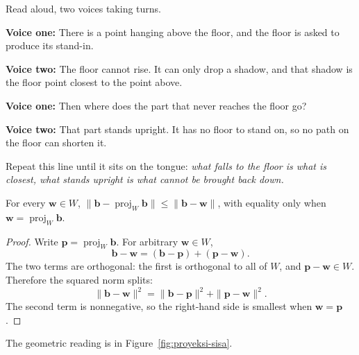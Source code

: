 \begin{bacakeras}
Read aloud, two voices taking turns.

\textbf{Voice one:} There is a point hanging above the floor, and the floor is asked to produce its stand-in.

\textbf{Voice two:} The floor cannot rise. It can only drop a shadow, and that shadow is the floor point closest to the point above.

\textbf{Voice one:} Then where does the part that never reaches the floor go?

\textbf{Voice two:} That part stands upright. It has no floor to stand on, so no path on the floor can shorten it.

Repeat this line until it sits on the tongue: \emph{what falls to the floor is what is closest, what stands upright is what cannot be brought back down.}
\end{bacakeras}

\begin{teorema}
For every $\mathbf{w}\in W$,
$\|\mathbf{b}-\operatorname{proj}_{W}\mathbf{b}\|\le\|\mathbf{b}-\mathbf{w}\|$, with
equality only when $\mathbf{w}=\operatorname{proj}_{W}\mathbf{b}$.
\end{teorema}

\begin{proof}
Write $\mathbf{p}=\operatorname{proj}_{W}\mathbf{b}$. For arbitrary $\mathbf{w}\in W$,
\[
  \mathbf{b}-\mathbf{w}=(\mathbf{b}-\mathbf{p})+(\mathbf{p}-\mathbf{w}).
\]
The two terms are orthogonal: the first is orthogonal to all of $W$, and
$\mathbf{p}-\mathbf{w}\in W$. Therefore the squared norm splits:
\[
  \|\mathbf{b}-\mathbf{w}\|^{2}=\|\mathbf{b}-\mathbf{p}\|^{2}+\|\mathbf{p}-\mathbf{w}\|^{2}.
\]
The second term is nonnegative, so the right-hand side is smallest when $\mathbf{w}=\mathbf{p}$.
\end{proof}

The geometric reading is in Figure~\ref{fig:proyeksi-sisa}.

